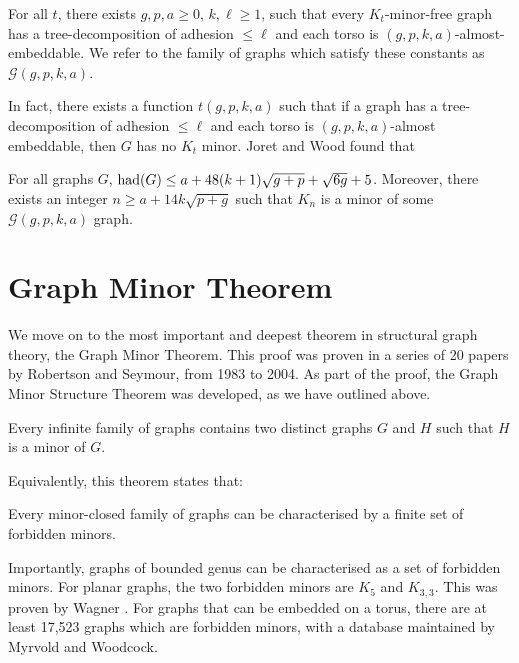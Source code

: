 \begin{theorem}
	For all \(t\), there exists \(g, p, a \geq 0\), \(k, \ell \geq 1\), such that every \(K_t\)-minor-free graph has a tree-decomposition of adhesion \(\leq \ell\) and each torso is \((g, p, k, a)\)-almost-embeddable. We refer to the family of graphs which satisfy these constants as \(\mathcal{G}(g, p, k, a)\). 
\end{theorem}
In fact, there exists a function \(t(g, p, k, a)\) such that if a graph has a tree-decomposition of adhesion \(\leq \ell\) and each torso is \((g, p, k, a)\)-almost embeddable, then \(G\) has no \(K_t\) minor. Joret and Wood\cite{joretCompleteGraphMinors2013} found that
\begin{theorem}\label{thm:graph_structure_bound_theorem}
	For all graphs \(G\),
	\(\operatorname{had}(G) \leq a + 48(k + 1)\sqrt{g + p} + \sqrt{6g} + 5\). Moreover, there exists an integer \(n \geq a + 1 4 k\sqrt{p + g}\) such that \(K_n\) is a minor of some \(\mathcal{G}(g, p, k, a)\) graph.
\end{theorem}

\section{Graph Minor Theorem}\label{sec:Graph Minor Theorem}
We move on to the most important and deepest theorem in structural graph theory, the Graph Minor Theorem. This proof was proven in a series of 20 papers by Robertson and Seymour, from 1983 to 2004. As part of the proof, the Graph Minor Structure Theorem was developed, as we have outlined above. 
\begin{theorem}
	Every infinite family of graphs contains two distinct graphs \(G\) and \(H\) such that \(H\) is a minor of \(G\).
\end{theorem}
Equivalently, this theorem states that:
\begin{theorem}
	Every minor-closed family of graphs can be characterised by a finite set of forbidden minors.
\end{theorem}
Importantly, graphs of bounded genus can be characterised as a set of forbidden minors.
For planar graphs, the two forbidden minors are \(K_5\) and \(K_{3,3}\). This was proven by Wagner \cite{wagnerUeberEigenschaftEbenen1937}. 
For graphs that can be embedded on a torus, there are at least 17,523 graphs which are forbidden minors, with a database maintained by Myrvold and Woodcock\cite{myrvoldLargeSetTorus2018}. 
